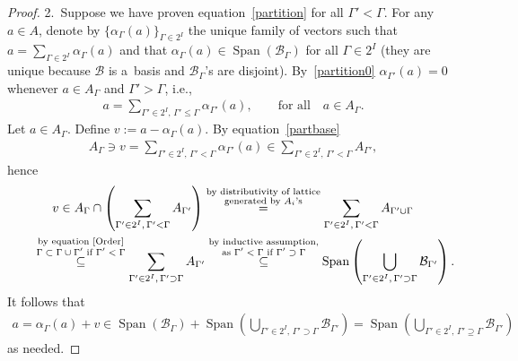 \documentclass[11pt]{article}
\DeclareMathOperator{\Span}{Span}
\begin{document}
\begin{proof}
2.~Suppose we have proven equation~\eqref{partition} for all $\Gamma'<\Gamma$.
For any $a\in A$, denote by $\{\alpha_\Gamma(a)\}_{\Gamma\in 2^I}$ the unique family of vectors such that
$a=\sum\limits_{\Gamma\in2^I}\alpha_\Gamma(a)$ and that $\alpha_\Gamma(a)\in \Span(\mathcal{B}_\Gamma)$ for all
$\Gamma\in2^I$ (they are unique because $\mathcal{B}$ is a~basis and $\mathcal{B}_\Gamma$'s are disjoint).
By~\eqref{partition0} $\alpha_{\Gamma'}(a)=0$ whenever $a\in A_\Gamma$ and $\Gamma'>\Gamma$, i.e.,
\begin{gather}
\label{partbase}
a=\sum\limits_{\Gamma'\in2^I,\, \Gamma'\leq\Gamma}\alpha_{\Gamma'}(a),
\qquad
\text{for all}
\quad
a\in A_\Gamma.
\end{gather}
Let $a\in A_\Gamma$.
Def\/ine $v:=a-\alpha_\Gamma(a)$.
By equation~\eqref{partbase}
\begin{gather*}
A_\Gamma\ni v = \sum\limits_{\Gamma'\in 2^I,
\,
\Gamma'<\Gamma}\alpha_{\Gamma'}(a)\in\sum\limits_{\Gamma'\in 2^I,
\,
\Gamma'<\Gamma}A_{\Gamma'},
\end{gather*}
hence
\begin{gather*}
v \in A_\Gamma\cap\left(\sum\limits_{\Gamma'\in 2^I,
\,
\Gamma'<\Gamma}A_{\Gamma'}\right)
\overset{\substack{\text{by distributivity of lattice}\\ \text{generated by $A_i$'s}}}{=}
\sum\limits_{\Gamma'\in 2^I,
\,
\Gamma'<\Gamma}A_{\Gamma'\cup\Gamma}
\\
\qquad \overset{\substack{\text{by equation~\eqref{Order}} \\ \text{$\Gamma\subset\Gamma\cup\Gamma'$ if $\Gamma'<\Gamma$}}}{\subseteq}
\sum\limits_{\Gamma'\in 2^I,
\,
\Gamma'\supset\Gamma}A_{\Gamma'}
 \overset{\substack{\text{by inductive assumption,} \\ \text{as $\Gamma'<\Gamma$ if $\Gamma'\supset\Gamma$}}}{\subseteq}
\Span\left(\bigcup_{\Gamma'\in 2^I,
\,
\Gamma'\supset\Gamma}\mathcal{B}_{\Gamma'} \right).
\end{gather*}
It follows that
\begin{gather*}
a= \alpha_\Gamma(a)+v\in\Span(\mathcal{B}_\Gamma)+\Span\left(\bigcup_{\Gamma'\in 2^I,
\,
\Gamma'\supset\Gamma}\mathcal{B}_{\Gamma'} \right) = \Span\left(\bigcup_{\Gamma'\in 2^I,
\,
\Gamma'\supseteq\Gamma}\mathcal{B}_{\Gamma'} \right)
\end{gather*}
as needed.
\end{proof}
\end{document}
